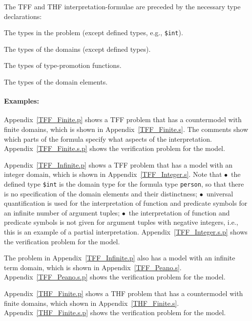 \documentclass{easychair}
\newcommand{\smalltt}[1]{\small \texttt{#1}}
\newenvironment{packed_itemize}{
\vspace*{-0.3em}
\begin{itemize}
\setlength{\partopsep}{0pt}
\setlength{\itemsep}{1pt}
\setlength{\parskip}{0pt}
\setlength{\parsep}{0pt}
}{\end{itemize}}
\begin{document}
\vspace*{0.5em}
The TFF and THF interpretation-formulae are preceded by the necessary type declarations:
\begin{packed_itemize}
\item The types in the problem (except defined types, e.g., {\smalltt{\$int}}).
\item The types of the domains (except defined types).
\item The types of type-promotion functions.
\item The types of the domain elements.
\end{packed_itemize}

\paragraph{Examples:}
\begin{packed_itemize}
\item Appendix~\ref{TFF_Finite.p} shows a TFF problem that has a countermodel with finite domains,
      which is shown in Appendix~\ref{TFF_Finite.s}.
      The comments show which parts of the formula specify what aspects of the interpretation.
      Appendix~\ref{TFF_Finite.s.p} shows the verification problem for the model.
\item Appendix~\ref{TFF_Infinite.p} shows a TFF problem that has a model with an integer domain,
      which is shown in Appendix~\ref{TFF_Integer.s}.
      Note that $\bullet$~the defined type {\smalltt{\$int}} is the domain type for the formula 
      type {\smalltt{person}}, so that there is no specification of the domain elements and their 
      distinctness; $\bullet$~universal quantification is used for the interpretation of function 
      and predicate symbols for an infinite number of argument tuples; $\bullet$~the 
      interpretation of function and predicate symbols is not given for argument tuples with 
      negative integers, i.e., this is an example of a partial interpretation.
      Appendix~\ref{TFF_Integer.s.p} shows the verification problem for the model.
\item The problem in Appendix~\ref{TFF_Infinite.p} also has a model with an infinite term domain,
      which is shown in Appendix~\ref{TFF_Peano.s}.
      Appendix~\ref{TFF_Peano.s.p} shows the verification problem for the model.
\item Appendix~\ref{THF_Finite.p} shows a THF problem that has a countermodel with finite domains,
      which shown in Appendix~\ref{THF_Finite.s}.
      Appendix~\ref{THF_Finite.s.p} shows the verification problem for the model.
\end{packed_itemize}
\end{document}
